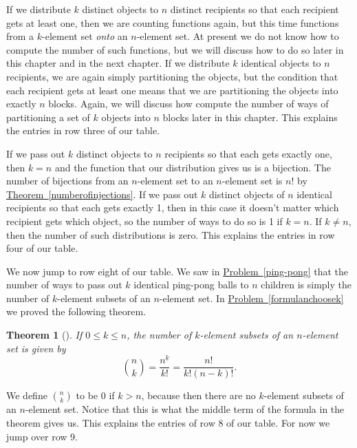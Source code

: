 \documentclass[10pt,]{book}
\theoremstyle{plain}
\newtheorem{theorem}{Theorem}[section]
\theoremstyle{definition}
\theoremstyle{definition}
\numberwithin{equation}{chapter}
\begin{document}
\par
\hypertarget{p-729}{}%
If we distribute \(k\) distinct objects to \(n\) distinct recipients so that each recipient gets at least one, then we are counting functions again, but this time functions from a \(k\)-element set \emph{onto} an \(n\)-element set. At present we do not know how to compute the number of such functions, but we will discuss how to do so later in this chapter and in the next chapter. If we distribute \(k\) identical objects to \(n\) recipients, we are again simply partitioning the objects, but the condition that each recipient gets at least one means that we are partitioning the objects into exactly \(n\) blocks. Again, we will discuss how compute the number of ways of partitioning a set of \(k\) objects into \(n\) blocks later in this chapter. This explains the entries in row three of our table.%
\par
\hypertarget{p-730}{}%
If we pass out \(k\) distinct objects to \(n\) recipients so that each gets exactly one, then \(k=n\) and the function that our distribution gives us is a bijection. The number of bijections from an \(n\)-element set to an \(n\)-element set is \(n!\) by \hyperref[numberofinjections]{Theorem~\ref{numberofinjections}}. If we pass out \(k\) distinct objects of \(n\) identical recipients so that each gets exactly 1, then in this case it doesn't matter which recipient gets which object, so the number of ways to do so is 1 if \(k=n\). If \(k\not=n\), then the number of such distributions is zero. This explains the entries in row four of our table.%
\par
\hypertarget{p-731}{}%
We now jump to row eight of our table. We saw in \hyperref[ping-pong]{Problem~\ref{ping-pong}} that the number of ways to pass out \(k\) identical ping-pong balls to \(n\) children is simply the number of \(k\)-element subsets of an \(n\)-element set. In \hyperref[formulanchoosek]{Problem~\ref{formulanchoosek}} we proved the following theorem.%
\begin{theorem}[{}]\label{theorem-5}
\hypertarget{p-732}{}%
If \(0\le k \le n\), the number of \(k\)-element subsets of an \(n\)-element set is given by%
\begin{equation*}
\binom{n}{k} = \frac{n^{\underline{k}}}{k!}
= \frac{n!}{k!(n-k)!}.
\end{equation*}
%
\end{theorem}
\hypertarget{p-733}{}%
We define \(\binom{n}{k}\) to be 0 if \(k>n\), because then there are no \(k\)-element subsets of an \(n\)-element set. Notice that this is what the middle term of the formula in the theorem gives us. This explains the entries of row 8 of our table. For now we jump over row 9.%
\end{document}
